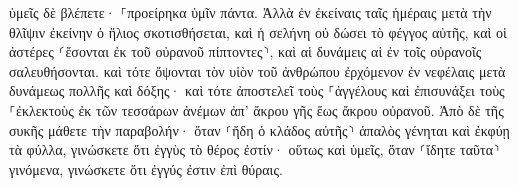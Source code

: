 \documentclass{openreader}
\begin{document}
ὑμεῖς δὲ βλέπετε· ⸀προείρηκα ὑμῖν πάντα. 
Ἀλλὰ ἐν ἐκείναις ταῖς ἡμέραις μετὰ τὴν θλῖψιν ἐκείνην ὁ ἥλιος σκοτισθήσεται, καὶ ἡ σελήνη οὐ δώσει τὸ φέγγος αὐτῆς, 
καὶ οἱ ἀστέρες ⸂ἔσονται ἐκ τοῦ οὐρανοῦ πίπτοντες⸃, καὶ αἱ δυνάμεις αἱ ἐν τοῖς οὐρανοῖς σαλευθήσονται. 
καὶ τότε ὄψονται τὸν υἱὸν τοῦ ἀνθρώπου ἐρχόμενον ἐν νεφέλαις μετὰ δυνάμεως πολλῆς καὶ δόξης· 
καὶ τότε ἀποστελεῖ τοὺς ⸀ἀγγέλους καὶ ἐπισυνάξει τοὺς ⸀ἐκλεκτοὺς ἐκ τῶν τεσσάρων ἀνέμων ἀπ’ ἄκρου γῆς ἕως ἄκρου οὐρανοῦ. 
Ἀπὸ δὲ τῆς συκῆς μάθετε τὴν παραβολήν· ὅταν ⸂ἤδη ὁ κλάδος αὐτῆς⸃ ἁπαλὸς γένηται καὶ ἐκφύῃ τὰ φύλλα, γινώσκετε ὅτι ἐγγὺς τὸ θέρος ἐστίν· 
οὕτως καὶ ὑμεῖς, ὅταν ⸂ἴδητε ταῦτα⸃ γινόμενα, γινώσκετε ὅτι ἐγγύς ἐστιν ἐπὶ θύραις. 
\end{document}
